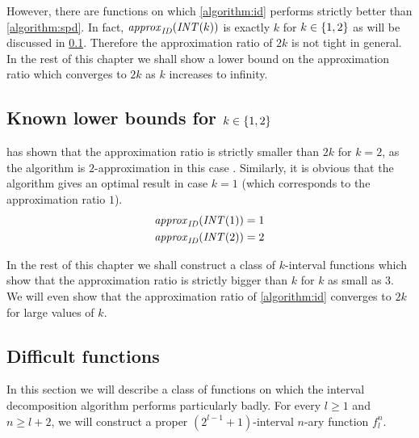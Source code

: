 However,
there are functions on which \cref{algorithm:id} performs strictly better than \cref{algorithm:spd}.
In fact, $\mathit{approx}_{\mathit{ID}} (\mathit{INT} (k))$ is exactly $k$
for $k \in \{1, 2\}$
as will be discussed in \cref{sec:approxidk12}.
Therefore the approximation ratio of $2k$ is not tight
in general.
In the rest of this chapter we shall show a lower bound on the approximation ratio which converges to $2k$ as $k$ increases to infinity.

\subsection{Known lower bounds for $k \in \{1, 2\}$}
\label{sec:approxidk12}

\citeauthor{Dubovsky2012} has shown
that the approximation ratio is strictly smaller than $2k$
for $k = 2$,
as the algorithm is $2$-approximation
in this case \citep[p.~39]{Dubovsky2012}. %
Similarly,
it is obvious that the algorithm
gives an optimal result in case $k = 1$
(which corresponds to the approximation ratio $1$).
\begin{align}
\mathit{approx}_{\mathit{ID}} (\mathit{INT} (1)) &= 1 \\
\mathit{approx}_{\mathit{ID}} (\mathit{INT} (2)) &= 2
\end{align}

In the rest of this chapter
we shall construct a class of $k$-interval functions which show that the approximation ratio is strictly bigger than $k$ for $k$ as small as $3$.
We will even show that the approximation ratio of \cref{algorithm:id} converges to $2k$ for large values of $k$.

\subsection{Difficult functions}
\label{sec:difficultfns}

In this section we will describe a class of functions
on which the interval decomposition algorithm
performs particularly badly.
For every $l \geq 1$ and $n \geq l+2$,
we will construct
a proper $(2^{l-1} + 1)$-interval $n$-ary function $f_l^n$.

